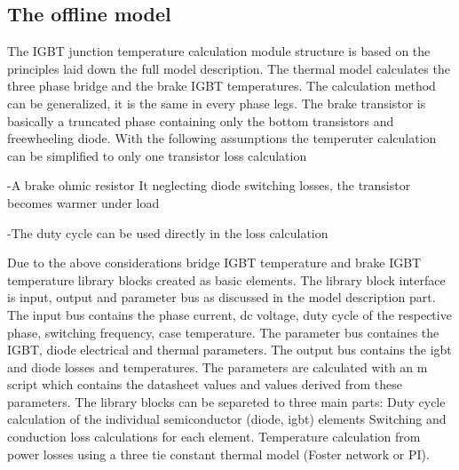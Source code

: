 \subsection{The offline model}
The IGBT junction temperature calculation module structure is based on the principles laid down the full model description. The thermal model calculates the three phase bridge and the brake IGBT temperatures. The calculation method can be generalized, it is the same in every phase legs. The brake transistor is basically a truncated phase containing only the bottom transistors and freewheeling diode. With the following assumptions the temperuter calculation can be simplified to only one transistor loss calculation

-A brake ohmic resistor
It neglecting diode switching losses, the transistor becomes warmer under load

-The duty cycle can be used directly in the loss calculation

Due to the above considerations bridge IGBT temperature and brake IGBT temperature library blocks created as basic elements. The library block interface is input, output and parameter bus as discussed in the model description part. The input bus contains the phase current, dc voltage, duty cycle of the respective phase, switching frequency, case temperature. The parameter bus containes the IGBT, diode electrical and thermal parameters. The output bus contains the igbt and diode losses and temperatures. The parameters are calculated with an m script which contains the datasheet values and values derived from these parameters.
The library blocks can be separeted to three main parts:
Duty cycle calculation of the individual semiconductor (diode, igbt) elements
Switching and conduction loss calculations for each element.
Temperature calculation from power losses using a three tie constant thermal model (Foster network or PI). 

